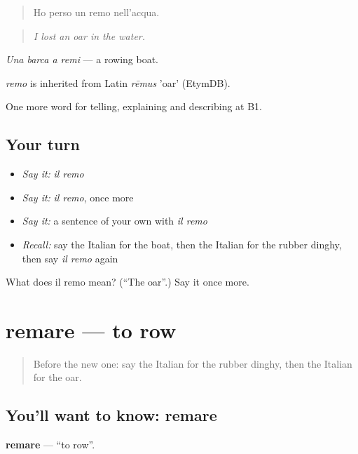 \begin{quote}
Ho perso un remo nell'acqua.
\end{quote}

\begin{quote}
\emph{I lost an oar in the water.}
\end{quote}

\emph{Una barca a remi} — a rowing boat.

\begin{cousinweb}
\emph{remo} is inherited from Latin \emph{rēmus} 'oar' (EtymDB).
\end{cousinweb}

\begin{grammarlens}[title={What you've built}]
One more word for telling, explaining and describing at B1.
\end{grammarlens}

\subsection*{Your turn}
\begin{itemize}
\raggedright
  \item \emph{Say it:} \emph{il remo}
  \item \emph{Say it:} \emph{il remo}, once more
  \item \emph{Say it:} a sentence of your own with \emph{il remo}
  \item \emph{Recall:} say the Italian for the boat, then the Italian for the rubber dinghy, then say \emph{il remo} again
\end{itemize}

\begin{tcolorbox}[breakable,colback=teal!4,colframe=teal!35!black,title={Before you move on}]
What does il remo mean? (\textquotedblleft{}The oar\textquotedblright{}.) Say it once more.
\end{tcolorbox}
\section[remare]{remare — to row}

\label{lesson:IT-C422-remare}



\begin{quote}
Before the new one: say the Italian for the rubber dinghy, then the Italian for the oar.
\end{quote}

\subsection*{You'll want to know: remare}
\textbf{remare} — \textquotedblleft{}to row\textquotedblright{}.

